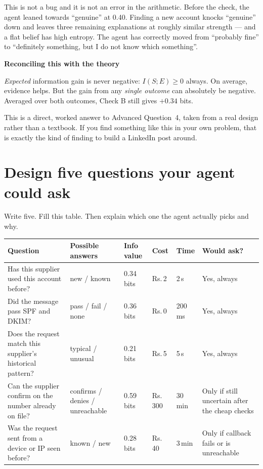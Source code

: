 \documentclass[11pt,a4paper]{article}
\newcommand{\rs}{Rs.\,}
\newcommand{\boxtitle}[1]{{\bfseries #1}\par\vspace{2pt}}
\begin{document}
This is not a bug and it is not an error in the arithmetic. Before the check, the agent leaned
towards ``genuine'' at 0.40. Finding a new account knocks ``genuine'' down and leaves three
remaining explanations at roughly similar strength --- and a flat belief has high entropy. The
agent has correctly moved from ``probably fine'' to ``definitely something, but I do not know
which something''.

\begin{sbbox}
\boxtitle{Reconciling this with the theory}
\emph{Expected} information gain is never negative: $I(S;E) \geq 0$ always. On average, evidence
helps. But the gain from any \emph{single outcome} can absolutely be negative. Averaged over both
outcomes, Check B still gives $+0.34$ bits.

This is a direct, worked answer to Advanced Question~4, taken from a real design rather than a
textbook. If you find something like this in your own problem, that is exactly the kind of
finding to build a LinkedIn post around.
\end{sbbox}

\section{Design five questions your agent could ask}
\label{sec:questions}

Write five. Fill this table. Then explain which one the agent actually picks and why.

\begin{center}
\small
\begin{tabular}{@{}L{3.6cm}L{2.4cm}C{1.3cm}C{1.2cm}C{1.2cm}L{2.8cm}@{}}
\toprule
\textbf{Question} & \textbf{Possible answers} & \textbf{Info value} & \textbf{Cost} & \textbf{Time} & \textbf{Would ask?} \\
\midrule
Has this supplier used this account before? & new / known & 0.34 bits & \rs 2 & 2\,s & Yes, always \\[3pt]
Did the message pass SPF and DKIM? & pass / fail / none & 0.36 bits & \rs 0 & 200\,ms & Yes, always \\[3pt]
Does the request match this supplier's historical pattern? & typical / unusual & 0.21 bits & \rs 5 & 5\,s & Yes, always \\[3pt]
Can the supplier confirm on the number already on file? & confirms / denies / unreachable & 0.59 bits & \rs 300 & 30\,min & Only if still uncertain after the cheap checks \\[3pt]
Was the request sent from a device or IP seen before? & known / new & 0.28 bits & \rs 40 & 3\,min & Only if callback fails or is unreachable \\
\bottomrule
\end{tabular}
\end{center}
\end{document}
